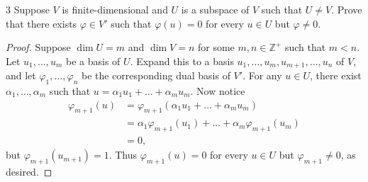 \documentclass{extarticle}
\newenvironment{problem}[1]{\begin{prob*}{#1}{}}{\end{prob*}}
\newcommand{\Z}{\mathbb{Z}}
\begin{document}
\begin{problem}{3}
Suppose $V$ is finite-dimensional and $U$ is a subspace of $V$ such that $U\neq V$.  Prove that there exists $\varphi\in V'$ such that $\varphi(u)=0$ for every $u\in U$ but $\varphi\neq 0$.
\end{problem}
\begin{proof}
Suppose $\dim U = m$ and $\dim V = n$ for some $m,n\in\Z^+$ such that $m < n$.  Let $u_1,\dots,u_m$ be a basis of $U$.  Expand this to a basis $u_1,\dots, u_m,u_{m+1},\dots,u_n$ of $V$, and let $\varphi_1,\dots,\varphi_n$ be the corresponding dual basis of $V'$.  For any $u\in U$, there exist $\alpha_1,\dots,\alpha_m$ such that $u=\alpha_1u_1+\dots+\alpha_mu_m$.  Now notice
\begin{align*}
\varphi_{m+1}(u) &= \varphi_{m+1}(\alpha_1u_1+\dots+\alpha_mu_m)\\
&= \alpha_1\varphi_{m+1}(u_1) + \dots + \alpha_m\varphi_{m+1}(u_m)\\
&= 0,
\end{align*}
but $\varphi_{m+1}(u_{m+1}) = 1$.  Thus $\varphi_{m+1}(u)=0$ for every $u\in U$ but $\varphi_{m+1}\neq 0$, as desired.
\end{proof}
\end{document}
